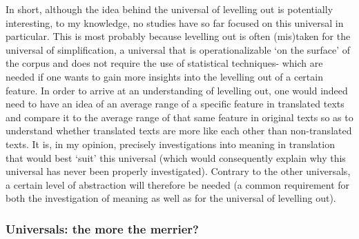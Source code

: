 In short, although the idea behind the universal of levelling out is potentially interesting, to my knowledge, no studies have so far focused on this universal in particular. This is most probably because levelling out is often (mis)taken for the universal of simplification, a universal that is operationalizable ‘on the surface’ of the corpus and does not require the use of statistical techniques- which are needed if one wants to gain more insights into the levelling out of a certain feature. In order to arrive at an understanding of levelling out, one would indeed need to have an idea of an average range of a specific feature in translated texts and compare it to the average range of that same feature in original texts so as to understand whether translated texts are more like each other than non-translated texts. It is, in my opinion, precisely investigations into meaning in translation that would best ‘suit’ this universal (which would consequently explain why this universal has never been properly investigated). Contrary to the other universals, a certain level of abstraction will therefore be needed (a common requirement for both the investigation of meaning as well as for the universal of levelling out).


\subsubsection{\label{sec:2.2.2.5}  Universals: the more the merrier?}

